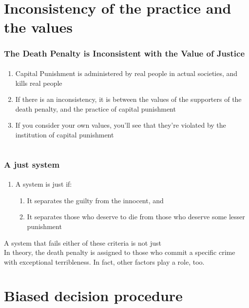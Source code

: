 \documentclass{beamer}
\begin{document}
\section{Inconsistency of the practice and the values}

\begin{frame}
    \frametitle{The Death Penalty is Inconsistent with the Value of 
Justice}
    \framesubtitle{}
\begin{enumerate}
\item Capital Punishment is administered by real people in 
actual societies, and kills real people
\item If there is an inconsistency, it is between the values of the 
supporters of the death penalty, and the practice of capital punishment
\item If you consider your own values, you'll see that they're violated 
by the institution of capital punishment

\end{enumerate}



\end{frame}


\section{}

\begin{frame}
    \frametitle{A just system}
    \framesubtitle{}
\begin{enumerate}
\item A system is just if:
\begin{enumerate}
\item It separates the guilty from the innocent, and
\item It separates those who deserve to die from those who deserve some 
lesser punishment


\end{enumerate}
\end{enumerate}

A system that fails either of these criteria is not just \\

In theory, the death penalty is assigned to those who commit a specific 
crime with exceptional terribleness.  In fact, other factors play a 
role, too.


\end{frame}


\section{Biased decision procedure}
\end{document}
